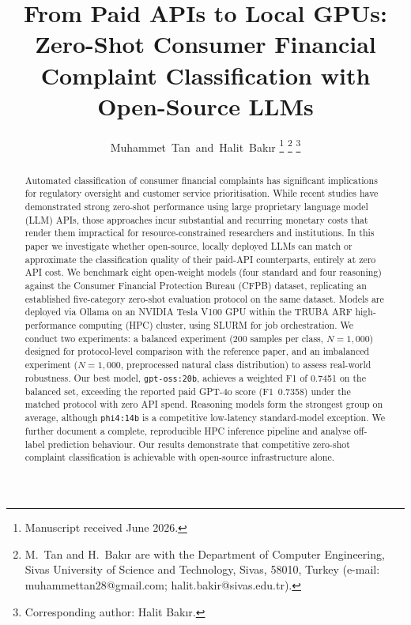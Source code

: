 \documentclass[journal]{IEEEtran}
\begin{document}
\title{From Paid APIs to Local GPUs: Zero-Shot Consumer Financial\\
Complaint Classification with Open-Source LLMs}

\author{Muhammet~Tan~and~Halit~Bak{\i}r%
\thanks{Manuscript received June 2026.}%
\thanks{M.~Tan and H.~Bak{\i}r are with the Department of Computer
Engineering, Sivas University of Science and Technology, Sivas, 58010,
Turkey (e-mail: muhammettan28@gmail.com; halit.bakir@sivas.edu.tr).}%
\thanks{Corresponding author: Halit Bak{\i}r.}%
}

\maketitle

\begin{abstract}
Automated classification of consumer financial complaints has significant
implications for regulatory oversight and customer service prioritisation.
While recent studies have demonstrated strong zero-shot performance using
large proprietary language model (LLM) APIs, those approaches incur
substantial and recurring monetary costs that render them impractical for
resource-constrained researchers and institutions. In this paper we
investigate whether open-source, locally deployed LLMs can match or
approximate the classification quality of their paid-API counterparts,
entirely at zero API cost. We benchmark eight open-weight models
(four standard and four reasoning) against the Consumer Financial
Protection Bureau (CFPB) dataset, replicating an established five-category
zero-shot evaluation protocol on the same dataset. Models are deployed
via Ollama on an NVIDIA Tesla V100 GPU within the TRUBA ARF
high-performance computing (HPC) cluster, using SLURM for job
orchestration. We conduct two experiments: a balanced experiment
(200 samples per class, $N{=}1{,}000$) designed for protocol-level
comparison with the reference paper, and an imbalanced experiment
($N{=}1{,}000$, preprocessed natural class distribution) to assess
real-world robustness. Our best model,
\texttt{gpt-oss:20b}, achieves a weighted F1 of 0.7451 on the balanced
set, exceeding the reported paid GPT-4o score (F1~0.7358) under the
matched protocol with zero API spend.
Reasoning models form the strongest group on average, although
\texttt{phi4:14b} is a competitive low-latency standard-model exception. We further
document a complete, reproducible HPC inference pipeline and analyse
off-label prediction behaviour. Our results demonstrate that competitive
zero-shot complaint classification is achievable with open-source
infrastructure alone.
\end{abstract}
\end{document}
